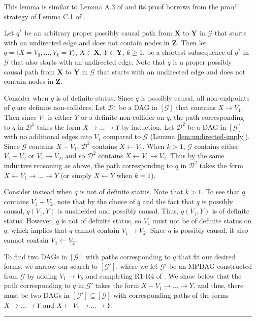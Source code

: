 \documentclass[twoside]{article}
\newcommand{\mb}[1]{\mathbf{#1}}
\newcommand{\g}[1][G]{\mathcal{#1}}
\newenvironment{proofof}[1][]{\begin{trivlist}
\item[\hskip \labelsep {\bfseries Proof of #1.}]}{\hfill\BlackBox\end{trivlist}}
\newcommand{\BlackBox}{\rule{1.5ex}{1.5ex}}
\begin{document}
\begin{proofof}[Lemma \ref{lem:twopaths-corrollary}]
    This lemma is similar to Lemma A.3 of \cite{perkovic2020identifying} and its proof borrows from the proof strategy of Lemma C.1 of \cite{perkovic2017interpreting}.
    
    Let $q^*$ be an arbitrary proper possibly causal path from $\mb{X}$ to $\mb{Y}$ in $\g$ that starts with an undirected edge and does not contain nodes in $\mb{Z}$. Then let $q=\langle X=V_0, \dots, V_k=Y\rangle$, $X \in \mb{X}$, $Y \in \mb{Y}$, $k \ge 1$, be a shortest subsequence of $q^*$ in $\g$ that also starts with an undirected edge. Note that $q$ is a proper possibly causal path from $\mb{X}$ to $\mb{Y}$ in $\g$ that starts with an undirected edge and does not contain nodes in $\mb{Z}$.

    Consider when $q$ is of definite status. Since $q$ is possibly causal, all non-endpoints of $q$ are definite non-colliders. Let $\g[D]^1$ be a DAG in $[\g]$ that contains $X \to V_1$. Then since $V_1$ is either $Y$ or a definite non-collider on $q$, the path corresponding to $q$ in $\g[D]^1$ takes the form $X \to \dots \to Y$ by induction. Let $\g[D]^2$ be a DAG in $[\g]$ with no additional edges into $V_1$ compared to $\g$ (Lemma \ref{lem:undirected-imply}). Since $\g$ contains $X - V_1$, $\g[D]^2$ contains $X \gets V_1$. When $k>1$, $\g$ contains either $V_1 - V_2$ or $V_1 \to V_2$, and so $\g[D]^2$ contains $X \gets V_1 \to V_2$. Thus by the same inductive reasoning as above, the path corresponding to $q$ in $\g[D]^2$ takes the form $X \gets V_1 \to \dots \to Y$ (or simply $X \gets Y$ when $k=1$).
    
    Consider instead when $q$ is not of definite status. Note that $k>1$. To see that $q$ contains $V_1 - V_2$, note that by the choice of $q$ and the fact that $q$ is possibly causal, $q(V_1,Y)$ is unshielded and possibly causal. Thus, $q(V_1,Y)$ is of definite status. However, $q$ is not of definite status, so $V_1$ must not be of definite status on $q$, which implies that $q$ cannot contain $V_1 \to V_2$. Since $q$ is possibly causal, it also cannot contain $V_1 \gets V_2$.

    To find two DAGs in $[\g]$ with paths corresponding to $q$ that fit our desired forms, we narrow our search to $[\g']$, where we let $\g'$ be an MPDAG constructed from $\g$ by adding $V_1 \to V_2$ and completing R1-R4 of \cite{meek1995causal}. We show below that the path corresponding to $q$ in $\g'$ takes the form $X - V_1 \to \dots \to Y$, and thus, there must be two DAGs in $[\g'] \subseteq [\g]$ with corresponding paths of the forms $X \to \dots \to Y$ and $X \gets V_1 \to \dots \to Y$.
            

\end{proofof}
\end{document}
